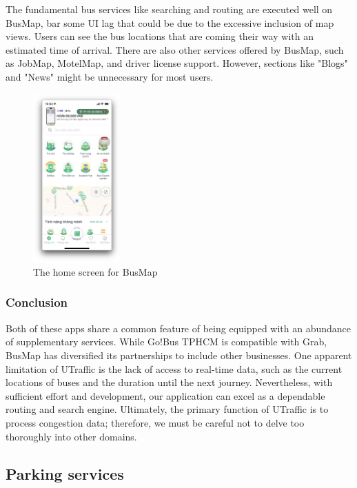 The fundamental bus services like searching and routing are executed well on BusMap, bar some UI lag that could be due to the excessive inclusion of map views. Users can see the bus locations that are coming their way with an estimated time of arrival. There are also other services offered by BusMap, such as JobMap, MotelMap, and driver license support. However, sections like "Blogs" and "News" might be unnecessary for most users.

\begin{figure}[H]
    \centering
    \includegraphics[width=0.3\textwidth]{assets/images/Research/Bus/busmap_home.png}
    \caption{The home screen for BusMap}
    \label{fig:busmap_homescreen}
\end{figure}

\subsubsection{Conclusion}

Both of these apps share a common feature of being equipped with an abundance of supplementary services. While Go!Bus TPHCM is compatible with Grab, BusMap has diversified its partnerships to include other businesses. One apparent limitation of UTraffic is the lack of access to real-time data, such as the current locations of buses and the duration until the next journey. Nevertheless, with sufficient effort and development, our application can excel as a dependable routing and search engine. Ultimately, the primary function of UTraffic is to process congestion data; therefore, we must be careful not to delve too thoroughly into other domains.


\subsection{Parking services}

